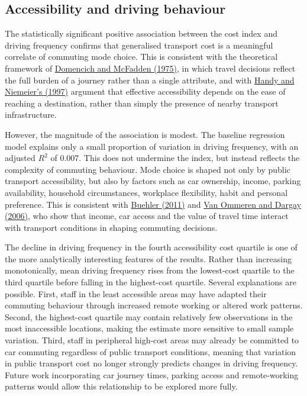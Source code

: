 \documentclass[11pt,a4paper]{article}
\newcommand{\hcite}[2]{\hyperlink{#1}{#2}}
\newcommand{\hcite}[2]{\hyperlink{#1}{#2}}
\begin{document}
\subsection{Accessibility and driving behaviour}

The statistically significant positive association between the cost index and driving frequency confirms that generalised transport cost is a meaningful correlate of commuting mode choice. This is consistent with the theoretical framework of \hcite{domencich1975}{Domencich and McFadden (1975)}, in which travel decisions reflect the full burden of a journey rather than a single attribute, and with \hcite{handy1997}{Handy and Niemeier's (1997)} argument that effective accessibility depends on the ease of reaching a destination, rather than simply the presence of nearby transport infrastructure.

However, the magnitude of the association is modest. The baseline regression model explains only a small proportion of variation in driving frequency, with an adjusted $R^2$ of 0.007. This does not undermine the index, but instead reflects the complexity of commuting behaviour. Mode choice is shaped not only by public transport accessibility, but also by factors such as car ownership, income, parking availability, household circumstances, workplace flexibility, habit and personal preference. This is consistent with \hcite{buehler2011}{Buehler (2011)} and \hcite{vanommeren2006}{Van Ommeren and Dargay (2006)}, who show that income, car access and the value of travel time interact with transport conditions in shaping commuting decisions.

The decline in driving frequency in the fourth accessibility cost quartile is one of the more analytically interesting features of the results. Rather than increasing monotonically, mean driving frequency rises from the lowest-cost quartile to the third quartile before falling in the highest-cost quartile. Several explanations are possible. First, staff in the least accessible areas may have adapted their commuting behaviour through increased remote working or altered work patterns. Second, the highest-cost quartile may contain relatively few observations in the most inaccessible locations, making the estimate more sensitive to small sample variation. Third, staff in peripheral high-cost areas may already be committed to car commuting regardless of public transport conditions, meaning that variation in public transport cost no longer strongly predicts changes in driving frequency. Future work incorporating car journey times, parking access and remote-working patterns would allow this relationship to be explored more fully.
\end{document}

